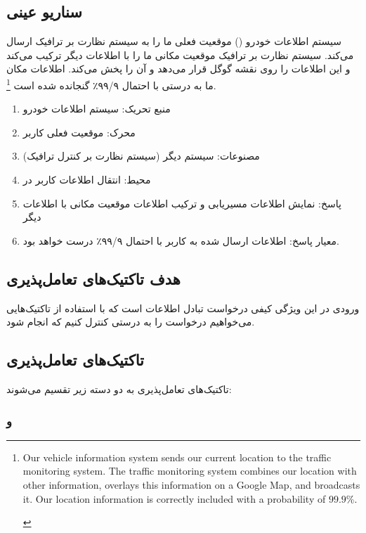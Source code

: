 \subsection{سناریو عینی}


سیستم اطلاعات خودرو () موقعیت فعلی ما را به سیستم نظارت بر ترافیک ارسال
می‌کند. سیستم نظارت بر ترافیک موقعیت مکانی ما را با اطلاعات دیگر ترکیب می‌کند و
این اطلاعات را روی نقشه گوگل قرار می‌دهد و آن را پخش می‌کند. اطلاعات مکان ما به
درستی با احتمال ۹۹/۹٪ گنجانده شده است \footnote{\begin{LTR} Our vehicle
information system sends our current location to the traffic monitoring system.
The traffic monitoring system combines our location with other information,
overlays this information on a Google Map, and broadcasts it. Our location
information is correctly included with a probability of $99.9$\%. \end{LTR}}.

\begin{enumerate}
    \item منبع تحریک: سیستم اطلاعات خودرو
    \item محرک: موقعیت فعلی کاربر
    \item مصنوعات: سیستم دیگر (سیستم نظارت بر کنترل ترافیک)
    \item محیط: انتقال اطلاعات کاربر در 
    \item پاسخ: نمایش اطلاعات مسیریابی و ترکیب اطلاعات موقعیت مکانی با اطلاعات
    دیگر
    \item معیار پاسخ: اطلاعات ارسال شده به کاربر با احتمال ۹۹/۹٪ درست خواهد بود.
\end{enumerate}

\subsection{هدف تاکتیک‌های تعامل‌پذیری}

ورودی در این ویژگی کیفی درخواست تبادل اطلاعات است که با استفاده از تاکتیک‌هایی
می‌خواهیم درخواست را به درستی کنترل کنیم که انجام شود.

\subsection{تاکتیک‌های تعامل‌پذیری}

تاکتیک‌های تعامل‌پذیری به دو دسته زیر تقسیم می‌شوند:

\subsubsection{ و }

